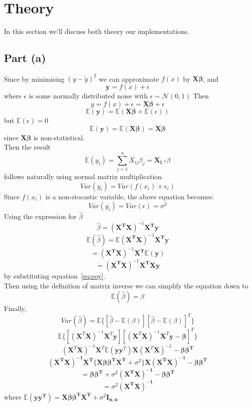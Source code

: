 \documentclass[sigconf, nonacm]{acmart}
\begin{document}
\section{Theory}
In this section we'll  discuss both theory our implementations.
\subsection{Part (a)}
\label{sub:parta}
Since by minimising $ {(y- \tilde y)}^2 $ we can approximate $ f(x) $ by $ \textbf{X} \boldsymbol{\beta}  $, and
\[ \textbf{y} = f(x) + \epsilon \] where $ \epsilon $ is some normally distributed noise with $ \epsilon \sim \mathcal{N}(0,1)  $
Then 
\[ y = f(x) + \epsilon = \textbf{X} \boldsymbol{\beta} + \epsilon  \]  
\[ \mathbb{E}(\boldsymbol{y}) = \mathbb{E}(\boldsymbol{X \beta} + \mathbb{E}(\epsilon)) \] 
but $ \mathbb{E}(\epsilon) = 0 $ 
\[ \mathbb{E}(\boldsymbol{y}) = \mathbb{E}(\boldsymbol{X \beta}) = \boldsymbol{X \beta} \]
since $ \boldsymbol{X \beta} $ is non-statistical. \\
Then the result
\begin{equation}
	\label{eq:eoy}
	\mathbb{E}(y_i) = \sum_{j=1}^{n} X_{ij} \beta_j = \boldsymbol{X_{i,*}} \beta
\end{equation}
follows naturally using normal matrix multiplication. \\
\[ Var(y_i) = Var(f(x_i) + \epsilon_i) \] 
Since $ f(x_i) $ is a non-stocastic variable, the above equation becomes:
\begin{equation}
	Var(y_i) = Var(\epsilon) = \sigma^2
\end{equation}
Using the expression for $ \hat \beta $ 
\[ \hat \beta = {(\boldsymbol{X^{T}X})}^{-1} \boldsymbol{X^{T}y} \] 
\[ \mathbb{E}{(\hat \beta)} = \mathbb{E}{(\boldsymbol{X^{T}X})}^{-1} \boldsymbol{X^{T}y} \] 
\[ = {(\boldsymbol{X^{T}X})}^{-1} \boldsymbol{X^{T}} \mathbb{E}(\textbf{y}) \] 
\[ = {(\boldsymbol{X^{T}X})}^{-1} \boldsymbol{X^{T}Xy}  \] 
by substituting equation~\ref{eq:eoy}. \\
Then using the definition of matrix inverse we can simplify the equation down to
\[ \mathbb{E}(\hat \beta) = \beta \] 
Finally,
\[ Var(\hat \beta) = \mathbb{E}\{ [\hat \beta - \mathbb{E}(\beta)] {[\hat \beta - \mathbb{E}(\beta)]}^{T}\} \] 
\[ \mathbb{E}\{[(\boldsymbol{X}^{T}\boldsymbol{X})^{-1}\boldsymbol{X}^{T} \boldsymbol{y}] [(\textbf{X}^{T}\textbf{X})^{-1} \textbf{X}^{T}\textbf{y} - \boldsymbol{\beta}]^{T} \} \] 
	\[ (\textbf{X}^{T}\textbf{X} )^{-1} \textbf{X}^{T} \mathbb{E}(\textbf{y}\textbf{y}^{T}) \textbf{X} (\textbf{X}^{T}\textbf{X}    )^{-1} - \boldsymbol{\beta \beta^{T}}\] 
\[ \boldsymbol{ (X^{T}X)^{-1} X^{T} \{ X \beta \beta^{T} X^{T}} + \sigma^2\} \boldsymbol{X (X^{T}X)^{-1} - \beta \beta^{T} } \] 
\[ = \boldsymbol{\beta \beta^{T}} + \sigma^2 \boldsymbol{(X^{T}X)^{-1} - \beta \beta^{T} } \] 
\[ = \sigma^2 \boldsymbol{(X^{T}X)^{-1}} \] 
where $ \mathbb{E}(\boldsymbol{yy^{T}}) = \boldsymbol { X \beta \beta^{T} X^{T}} + \sigma^2 \mathbf{I_{n,n}}$ 
\end{document}
